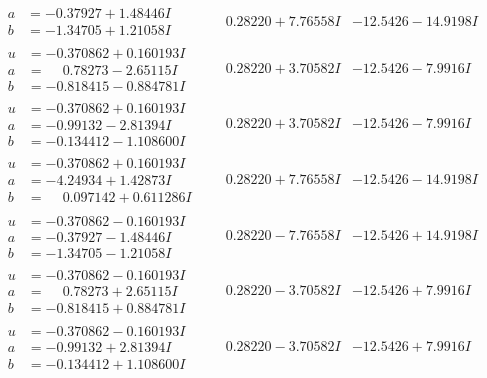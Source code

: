 \documentclass[1p]{elsarticle_modified}
\theoremstyle{definition}
\begin{document}
$$\begin{array}{c|c|c}
\begin{aligned}
a &= -0.37927 + 1.48446 I \\
b &= -1.34705 + 1.21058 I\end{aligned}
 & \phantom{-}0.28220 + 7.76558 I & -12.5426 - 14.9198 I \\ \hline\begin{aligned}
u &= -0.370862 + 0.160193 I \\
a &= \phantom{-}0.78273 - 2.65115 I \\
b &= -0.818415 - 0.884781 I\end{aligned}
 & \phantom{-}0.28220 + 3.70582 I & -12.5426 - 7.9916 I \\ \hline\begin{aligned}
u &= -0.370862 + 0.160193 I \\
a &= -0.99132 - 2.81394 I \\
b &= -0.134412 - 1.108600 I\end{aligned}
 & \phantom{-}0.28220 + 3.70582 I & -12.5426 - 7.9916 I \\ \hline\begin{aligned}
u &= -0.370862 + 0.160193 I \\
a &= -4.24934 + 1.42873 I \\
b &= \phantom{-}0.097142 + 0.611286 I\end{aligned}
 & \phantom{-}0.28220 + 7.76558 I & -12.5426 - 14.9198 I \\ \hline\begin{aligned}
u &= -0.370862 - 0.160193 I \\
a &= -0.37927 - 1.48446 I \\
b &= -1.34705 - 1.21058 I\end{aligned}
 & \phantom{-}0.28220 - 7.76558 I & -12.5426 + 14.9198 I \\ \hline\begin{aligned}
u &= -0.370862 - 0.160193 I \\
a &= \phantom{-}0.78273 + 2.65115 I \\
b &= -0.818415 + 0.884781 I\end{aligned}
 & \phantom{-}0.28220 - 3.70582 I & -12.5426 + 7.9916 I \\ \hline\begin{aligned}
u &= -0.370862 - 0.160193 I \\
a &= -0.99132 + 2.81394 I \\
b &= -0.134412 + 1.108600 I\end{aligned}
 & \phantom{-}0.28220 - 3.70582 I & -12.5426 + 7.9916 I \\ \hline\begin{aligned}

\end{aligned}
\end{array}$$
\end{document}
